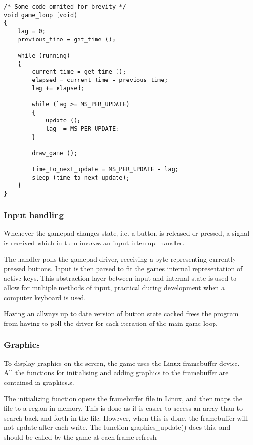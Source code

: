 \begin{lstlisting}[caption={Main game loop}, label={lst:main-game-loop}]
/* Some code ommited for brevity */
void game_loop (void)
{
    lag = 0;
    previous_time = get_time ();

    while (running)
    {
        current_time = get_time ();
        elapsed = current_time - previous_time;
        lag += elapsed;

        while (lag >= MS_PER_UPDATE)
        {
            update ();
            lag -= MS_PER_UPDATE;
        }

        draw_game ();

        time_to_next_update = MS_PER_UPDATE - lag;
        sleep (time_to_next_update);
    }
}
\end{lstlisting}


\subsubsection{Input handling}
Whenever the gamepad changes state, i.e. a button is released or pressed,
a signal is received which in turn invokes an input interrupt handler.

The handler polls the gamepad driver, receiving a byte representing currently
pressed buttons. Input is then parsed to fit the games internal representation
of active keys. This abstraction layer between input and internal state is used
to allow for multiple methods of input, practical during development when a
computer keyboard is used.

Having an allways up to date version of button state cached frees the program
from having to poll the driver for each iteration of the main game loop.

\subsubsection{Graphics}
To display graphics on the screen, the game uses the Linux framebuffer device.
All the functions for initialising and adding graphics to the framebuffer are
contained in graphics.s.

The initializing function opens the framebuffer file in Linux, and then maps the
file to a region in memory.  This is done as it is easier to access an array
than to search back and forth in the file.  However, when this is done, the
framebuffer will not update after each write.  The function graphics\_update()
does this, and should be called by the game at each frame refresh.

